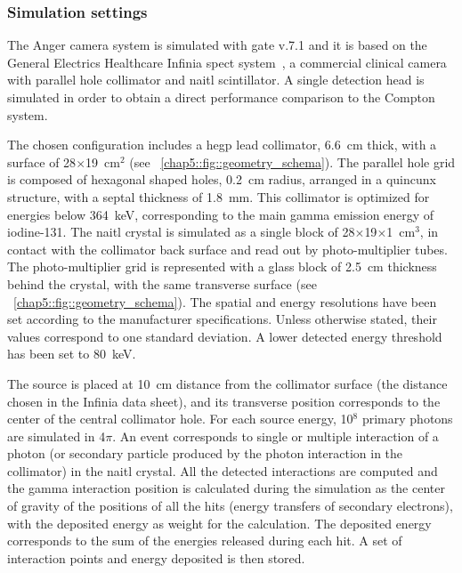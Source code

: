 \subsubsection{Simulation settings}\label{chap5::subsubsec::AC_settings}
The Anger camera system is simulated with \gls{gate} v.7.1 and it is based on the General Electrics Healthcare Infinia \gls{spect} system~\parencite{GeneralElectrics2006}, a commercial clinical camera with parallel hole collimator and \gls{naitl} scintillator. A single detection head is simulated in order to obtain a direct performance comparison to the Compton system.

The chosen configuration includes a \gls{hegp} lead collimator, 6.6~cm thick, with a surface of 28$\times$19~cm$^{2}$ (see \figurename~\ref{chap5::fig::geometry_schema}). The parallel hole grid is composed of hexagonal shaped holes, 0.2~cm radius, arranged in a quincunx structure, with a septal thickness of 1.8~mm. This collimator is optimized for energies below 364~keV, corresponding to the main gamma emission energy of iodine-131. The \gls{naitl} crystal is simulated as a single block of 28$\times$19$\times$1~cm$^{3}$, in contact with the collimator back surface and read out by photo-multiplier tubes. The photo-multiplier grid is represented with a glass block of 2.5~cm thickness behind the crystal, with the same transverse surface (see \figurename~\ref{chap5::fig::geometry_schema}). The spatial and energy resolutions have been set according to the manufacturer specifications. Unless otherwise stated, their values correspond to one standard deviation. A lower detected energy threshold has been set to 80~keV.

The source is placed at 10~cm distance from the collimator surface (the distance chosen in the Infinia data sheet), and its transverse position corresponds to the center of the central collimator hole. For each source energy, 10$^{8}$ primary photons are simulated in 4$\pi$. An event corresponds to single or multiple interaction of a photon (or secondary particle produced by the photon interaction in the collimator) in the \gls{naitl} crystal. All the detected interactions are computed and the gamma interaction position is calculated during the simulation as the center of gravity of the positions of all the hits (energy transfers of secondary electrons), with the deposited energy as weight for the calculation. The deposited energy corresponds to the sum of the energies released during each hit. A set of interaction points and energy deposited is then stored. 


